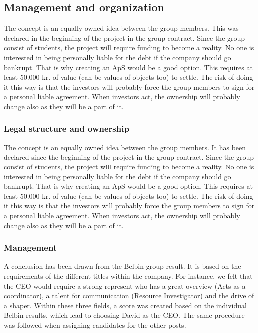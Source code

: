 \subsection{Management and organization}
The concept is an equally owned idea between the group members. This was declared in the beginning of the project in the group contract.
Since the group consist of students, the project will require funding to become a reality. No one is interested in being personally liable for the debt if the company should go bankrupt. That is why creating an ApS would be a good option. This requires at least 50.000 kr. of value (can be values of objects too) to settle. The risk of doing it this way is that the investors will probably force the group members to sign for a personal liable agreement. 
When investors act, the ownership will probably change also as they will be a part of it.

\subsubsection{Legal structure and ownership}
The concept is an equally owned idea between the group members. It has been declared since the beginning of the project in the group contract.
Since the group consist of students, the project will require funding to become a reality. No one is interested in being personally liable for the debt if the company should go bankrupt. That is why creating an ApS would be a good option. This requires at least 50.000 kr. of value (can be values of objects too) to settle. The risk of doing it this way is that the investors will probably force the group members to sign for a personal liable agreement. 
When investors act, the ownership will probably change also as they will be a part of it.
\subsubsection{Management}
A conclusion has been drawn from the Belbin group result. It is based on the requirements of the different titles within the company.  For instance, we felt that the CEO would require a strong represent who has a great overview (Acts as a coordinator), a talent for communication (Resource Investigator) and the drive of a shaper. Within these three fields, a score was created based on the individual Belbin results, which lead to choosing David as the CEO. 
The same procedure was followed when assigning candidates for the other posts. 

